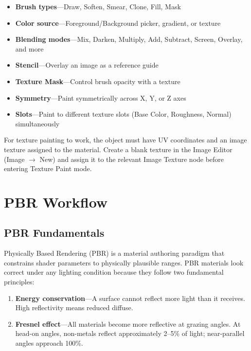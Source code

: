 \begin{itemize}[leftmargin=2em]
  \item \textbf{Brush types}---Draw, Soften, Smear, Clone, Fill, Mask
  \item \textbf{Color source}---Foreground/Background picker, gradient, or texture
  \item \textbf{Blending modes}---Mix, Darken, Multiply, Add, Subtract, Screen, Overlay, and more
  \item \textbf{Stencil}---Overlay an image as a reference guide
  \item \textbf{Texture Mask}---Control brush opacity with a texture
  \item \textbf{Symmetry}---Paint symmetrically across X, Y, or Z axes
  \item \textbf{Slots}---Paint to different texture slots (Base Color, Roughness, Normal) simultaneously
\end{itemize}

\begin{tipbox}
For texture painting to work, the object must have UV coordinates
and an image texture assigned to the material. Create a blank
texture in the Image Editor (Image $\rightarrow$ New) and assign it
to the relevant Image Texture node before entering Texture Paint
mode.
\end{tipbox}


\section{PBR Workflow}
\label{sec:shading:pbr}

\subsection{PBR Fundamentals}

Physically Based Rendering (PBR) is a material authoring paradigm
that constrains shader parameters to physically plausible ranges.
PBR materials look correct under any lighting condition because they
follow two fundamental principles:

\begin{enumerate}[leftmargin=2em]
  \item \textbf{Energy conservation}---A surface cannot reflect more
        light than it receives. High reflectivity means reduced diffuse.
  \item \textbf{Fresnel effect}---All materials become more
        reflective at grazing angles. At head-on angles, non-metals
        reflect approximately 2--5\% of light; near-parallel angles
        approach 100\%.
\end{enumerate}

